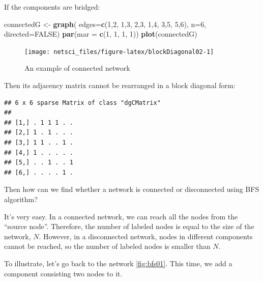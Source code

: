 \documentclass[
]{krantz}
\makeatletter
\newenvironment{Shaded}{\begin{snugshade}}{\end{snugshade}}
\newcommand{\DataTypeTok}[1]{\textcolor[rgb]{0.27,0.27,0.27}{#1}}
\newcommand{\DecValTok}[1]{\textcolor[rgb]{0.06,0.06,0.06}{#1}}
\newcommand{\KeywordTok}[1]{\textcolor[rgb]{0.27,0.27,0.27}{\textbf{#1}}}
\newcommand{\NormalTok}[1]{#1}
\newcommand{\OtherTok}[1]{\textcolor[rgb]{0.37,0.37,0.37}{#1}}
\newcommand{\StringTok}[1]{\textcolor[rgb]{0.5,0.5,0.5}{#1}}
\newenvironment{kframe}{%
\medskip{}
\setlength{\fboxsep}{.8em}
 \def\at@end@of@kframe{}%
 \ifinner\ifhmode%
  \def\at@end@of@kframe{\end{minipage}}%
  \begin{minipage}{\columnwidth}%
 \fi\fi%
 \def\FrameCommand##1{\hskip\@totalleftmargin \hskip-\fboxsep
 \colorbox{shadecolor}{##1}\hskip-\fboxsep
     \hskip-\linewidth \hskip-\@totalleftmargin \hskip\columnwidth}%
 \MakeFramed {\advance\hsize-\width
   \@totalleftmargin\z@ \linewidth\hsize
   \@setminipage}}%
 {\par\unskip\endMakeFramed%
 \at@end@of@kframe}
\renewenvironment{Shaded}{\begin{kframe}}{\end{kframe}}
\makeatother
\begin{document}
If the components are bridged:

\begin{Shaded}
\begin{Highlighting}[]
\NormalTok{connectedG <-}\StringTok{ }\KeywordTok{graph}\NormalTok{( }\DataTypeTok{edges=}\KeywordTok{c}\NormalTok{(}\DecValTok{1}\NormalTok{,}\DecValTok{2}\NormalTok{, }\DecValTok{1}\NormalTok{,}\DecValTok{3}\NormalTok{, }\DecValTok{2}\NormalTok{,}\DecValTok{3}\NormalTok{, }\DecValTok{1}\NormalTok{,}\DecValTok{4}\NormalTok{, }\DecValTok{3}\NormalTok{,}\DecValTok{5}\NormalTok{, }\DecValTok{5}\NormalTok{,}\DecValTok{6}\NormalTok{), }\DataTypeTok{n=}\DecValTok{6}\NormalTok{, }
                     \DataTypeTok{directed=}\OtherTok{FALSE}\NormalTok{)}
\KeywordTok{par}\NormalTok{(}\DataTypeTok{mar =} \KeywordTok{c}\NormalTok{(}\DecValTok{1}\NormalTok{, }\DecValTok{1}\NormalTok{, }\DecValTok{1}\NormalTok{, }\DecValTok{1}\NormalTok{))}
\KeywordTok{plot}\NormalTok{(connectedG)}
\end{Highlighting}
\end{Shaded}

\begin{figure}

{\centering \texttt{[image: netsci\_files/figure-latex/blockDiagonal02-1]} 

}

\caption{An example of connected network}\label{fig:blockDiagonal02}
\end{figure}

Then its adjacency matrix cannot be rearranged in a block diagonal form:

\begin{verbatim}
## 6 x 6 sparse Matrix of class "dgCMatrix"
##                 
## [1,] . 1 1 1 . .
## [2,] 1 . 1 . . .
## [3,] 1 1 . . 1 .
## [4,] 1 . . . . .
## [5,] . . 1 . . 1
## [6,] . . . . 1 .
\end{verbatim}

Then how can we find whether a network is connected or disconnected using BFS algorithm?

It's very easy. In a connected network, we can reach all the nodes from the ``source node''. Therefore, the number of labeled nodes is equal to the size of the network, \(N\). However, in a disconnected network, nodes in different components cannot be reached, so the number of labeled nodes is smaller than \(N\).

To illustrate, let's go back to the network \ref{fig:bfs01}. This time, we add a component consisting two nodes to it.
\end{document}
